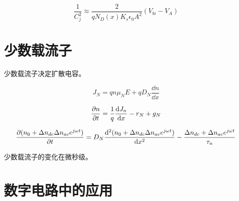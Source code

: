\documentclass[cn,11pt,chinese,black,simple]{../elegantbook}
\begin{document}
\[\frac{1}{C_j^2} \approx \frac{2}{q N_D(x) K_s \epsilon_0 A^2}(V_{bi} - V_A)\]


\section{少数载流子}

少数载流子决定扩散电容。

\[J_N = q n \mu_N E + q D_N \frac{\dd{n}}{\dd{x}}\]

\[\frac{\partial{}n}{\partial{}t} = \frac{1}{q}\frac{\mathrm{d}J_n}{\mathrm{d}x}-r_N + g_N\]

\[\frac{\partial{}(n_0 + \Delta n_{dc} \Delta n_{ac} e^{j \omega t})}{\partial{}t} = D_N \frac{\mathrm{d}^2 (n_0 + \Delta n_{dc} \Delta n_{ac} e^{j \omega t})}{\mathrm{d}x^2} - \frac{\Delta n_{dc} + \Delta n_{ac} e^{j\omega t}}{\tau_n}\]

少数载流子的变化在微秒级。


\section{数字电路中的应用}
\let\chapname\undefined
\ifx\mainclass\undefined
\end{document}
